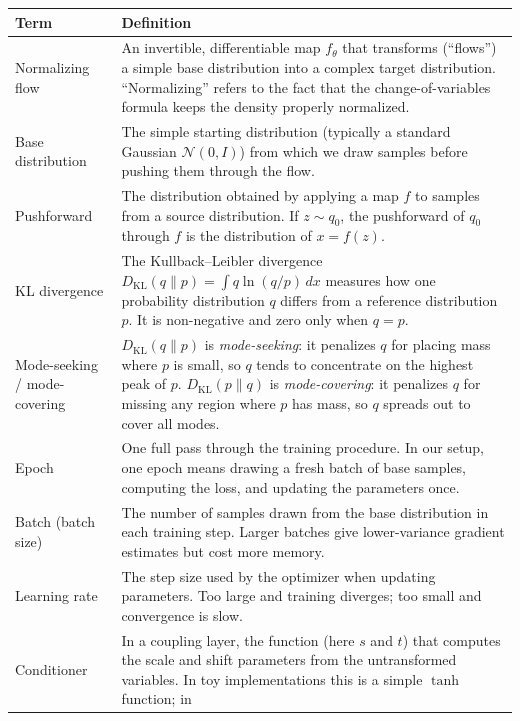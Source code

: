 \documentclass[11pt,letterpaper]{article}
\begin{document}
 
\begin{table}[H]
\centering
\small
\begin{tabular}{@{}p{}p{}@{}}
\toprule
\textbf{Term} & \textbf{Definition} \\
\midrule
Normalizing flow &
  An invertible, differentiable map $f_\theta$ that transforms
  (``flows'') a simple base distribution into a complex target
  distribution. ``Normalizing'' refers to the fact that the
  change-of-variables formula keeps the density properly normalized. \\[4pt]
Base distribution &
  The simple starting distribution (typically a standard Gaussian
  $\mathcal{N}(0, I)$) from which we draw samples before pushing
  them through the flow. \\[4pt]
Pushforward &
  The distribution obtained by applying a map $f$ to samples from
  a source distribution. If $z \sim q_0$, the pushforward of $q_0$
  through $f$ is the distribution of $x = f(z)$. \\[4pt]
KL divergence &
  The Kullback--Leibler divergence $D_\mathrm{KL}(q \| p) =
  \int q \ln(q/p)\,dx$ measures how one probability distribution
  $q$ differs from a reference distribution $p$. It is non-negative
  and zero only when $q = p$. \\[4pt]
Mode-seeking / mode-covering &
  $D_\mathrm{KL}(q\|p)$ is \emph{mode-seeking}: it penalizes $q$
  for placing mass where $p$ is small, so $q$ tends to concentrate
  on the highest peak of $p$.
  $D_\mathrm{KL}(p\|q)$ is \emph{mode-covering}: it penalizes $q$
  for missing any region where $p$ has mass, so $q$ spreads out to
  cover all modes. \\[4pt]
Epoch &
  One full pass through the training procedure. In our setup, one epoch
  means drawing a fresh batch of base samples, computing the loss, and
  updating the parameters once. \\[4pt]
Batch (batch size) &
  The number of samples drawn from the base distribution in each
  training step. Larger batches give lower-variance gradient estimates
  but cost more memory. \\[4pt]
Learning rate &
  The step size used by the optimizer when updating parameters. Too
  large and training diverges; too small and convergence is slow. \\[4pt]
Conditioner &
  In a coupling layer, the function (here $s$ and $t$) that computes
  the scale and shift parameters from the untransformed variables.
  In toy implementations this is a simple $\tanh$ function; in

\end{tabular}
\end{table}
\end{document}
